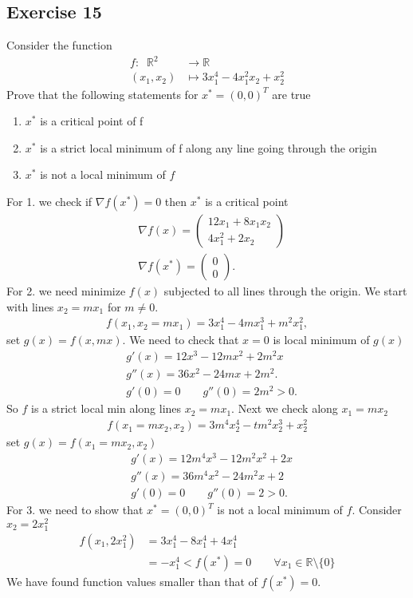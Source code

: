 \subsection{Exercise 15}
Consider the function
\begin{align}
    f : \;\;\mathbb{R}^{2}&\to \mathbb{R}\\
    (x_1, x_2) &\mapsto 3x_1^{4}-4x_1^{2}x_2 + x_2^{2}
\end{align}
Prove that the following statements for $x^{*}=(0,0)^{T}$ are true
\begin{enumerate}
    \item $x^{*}$ is a critical point of f
    \item $x^{*}$ is a strict local minimum of f along any line going through
        the origin
    \item $x^{*}$ is not a local minimum of $f$
\end{enumerate}
For 1. we check if $\nabla f(x^{*}) = 0$ then $x^{*}$ is a critical point
\begin{align}
&    \nabla f(x) =
    \begin{pmatrix}
        12x_1 + 8 x_1 x_2\\
        4x_1^{2} + 2x_2
    \end{pmatrix} \\
&    \nabla f(x^{*}) =
    \begin{pmatrix}
        0\\
        0
    \end{pmatrix}.
\end{align}
For 2. we need minimize $f(x)$ subjected to all lines through the origin. We
start with lines $x_2 = m x_1$ for $m \neq 0$.
\begin{align}
    f(x_1, x_2=mx_1) = 3x_1^{4} - 4mx_1^{3} + m^{2}x_1^{2},
\end{align}
set $g(x) = f(x, mx)$. We need to check that $x=0$ is local minimum of $g(x)$
\begin{align}
    &g'(x) = 12x^{3}-12mx^{2} + 2m^{2}x\\
    &g''(x) = 36x^{2} - 24m x + 2m^{2} .\\
    &g'(0) = 0 \qquad  g''(0) = 2m^{2}>0.
\end{align}
So $f$ is a strict local min along lines $x_2 = mx_1$. Next we check along
$x_1 = mx_2$
\begin{align}
   f(x_1=mx_2, x_{2}) = 3m^{4}x_2^{4}-tm^{2}x_2^{3} + x_2^{2}
\end{align}
set $g(x) = f(x_1=mx_2, x_2)$
\begin{align}
 &   g'(x) = 12m^{4}x^{3}-12m^{2}x^{2}+2x\\
 &   g''(x) = 36m^{4}x^{2} - 24m^{2}x + 2\\
 & g'(0) =0 \qquad g''(0) =  2 > 0.
\end{align}
For 3. we need to show that $x^{*}=(0,0)^{T}$ is not a local minimum of $f$.
Consider $x_2 = 2x_1^{2}$
\begin{align}
    f(x_1, 2x_1^{2}) &= 3x_1^{4} - 8x_1^{4} + 4x_1^{4}\\
                     &= -x_1^{4} < f(x^{*}) = 0\qquad \forall x_1 \in \mathbb{R}\setminus \{0\}
\end{align}
We have found function values smaller than that of $f(x^{*}) = 0$.
